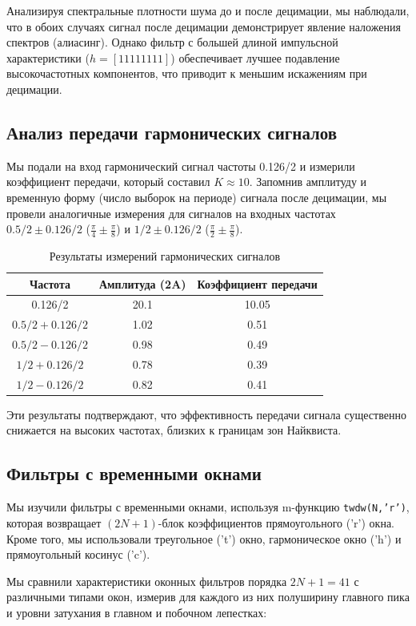 Анализируя спектральные плотности шума до и после децимации, мы наблюдали, что в обоих случаях сигнал после децимации демонстрирует явление наложения спектров (алиасинг). Однако фильтр с большей длиной импульсной характеристики ($h = [1 1 1 1 1 1 1 1]$) обеспечивает лучшее подавление высокочастотных компонентов, что приводит к меньшим искажениям при децимации.

\subsection{Анализ передачи гармонических сигналов}
Мы подали на вход гармонический сигнал частоты 0.126/2 и измерили коэффициент передачи, который составил $K \approx 10$. Запомнив амплитуду и временную форму (число выборок на периоде) сигнала после децимации, мы провели аналогичные измерения для сигналов на входных частотах $0.5/2 \pm 0.126/2$ ($\frac{\pi}{4} \pm \frac{\pi}{8}$) и $1/2 \pm 0.126/2$ ($\frac{\pi}{2} \pm \frac{\pi}{8}$).

\begin{longtable}[c]{|c|c|c|}
\caption{Результаты измерений гармонических сигналов}
\label{tab:harmonic_signals}\\
\hline
Частота & Амплитуда (2A) & Коэффициент передачи \\ \hline
\endfirsthead
%
\endhead
%
0.126/2 & 20.1 & 10.05 \\ \hline
$0.5/2 + 0.126/2$ & 1.02 & 0.51 \\ \hline
$0.5/2 - 0.126/2$ & 0.98 & 0.49 \\ \hline
$1/2 + 0.126/2$ & 0.78 & 0.39 \\ \hline
$1/2 - 0.126/2$ & 0.82 & 0.41 \\ \hline
\end{longtable}

Эти результаты подтверждают, что эффективность передачи сигнала существенно снижается на высоких частотах, близких к границам зон Найквиста.

\subsection{Фильтры с временными окнами}
Мы изучили фильтры с временными окнами, используя m-функцию \texttt{twdw(N,'r')}, которая возвращает $(2N+1)$-блок коэффициентов прямоугольного ('r') окна. Кроме того, мы использовали треугольное ('t') окно, гармоническое окно ('h') и прямоугольный косинус ('c').

Мы сравнили характеристики оконных фильтров порядка $2N + 1 = 41$ с различными типами окон, измерив для каждого из них полуширину главного пика и уровни затухания в главном и побочном лепестках:

